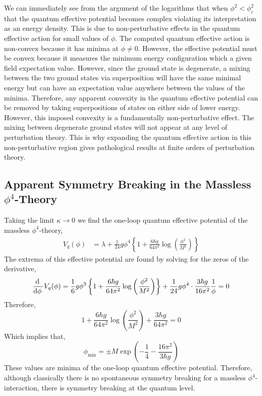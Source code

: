 \documentclass[12pt]{article}
\begin{document}
We can immediately see from the argument of the logarithms that when $\phi^2 < \phi_c^2$ that the quantum effective potential becomes complex violating its interpretation as an energy density. This is due to non-perturbative effects in the quantum effective action for small values of $\phi$. The computed quantum effective action is non-convex because it has minima at $\phi \neq 0$. However, the effective potential must be convex because it measures the minimum energy configuration which a given field expectation value. However, since the ground state is degenerate, a mixing between the two ground states via superposition will have the same minimal energy but can have an expectation value anywhere between the values of the minima. Therefore, any apparent convexity in the quantum effective potential can be removed by taking superpositions of states on either side of lower energy. However, this imposed convexity is a fundamentally non-perturbative effect. The mixing between degenerate ground states will not appear at any level of perturbation theory. This is why expanding the quantum effective action in this non-perturbative region gives pathological results at finite orders of perturbation theory. 

\subsection{Apparent Symmetry Breaking in the Massless $\phi^4$-Theory}

Taking the limit $\kappa \to 0$ we find the one-loop quantum effective potential of the massless $\phi^4$-theory,
\begin{align*}
V_q(\phi) & = \lambda + \frac{1}{24} g \phi^4 \left\{1 + \frac{6 \hbar g}{64 \pi^2} \log{\left( \frac{\phi^2}{M^2} \right)} \right\}
\end{align*}
The extrema of this effective potential are found by solving for the zeros of the derivative,
\[ \frac{\mathrm{d} \:}{\mathrm{d}\phi \:} V_q(\phi) = \frac{1}{6} g \phi^3 
\left\{1 + \frac{6 \hbar g}{64 \pi^2} \log{\left( \frac{\phi^2}{M^2} \right)} \right\} + \frac{1}{24} g \phi^4 \cdot \frac{3 \hbar g}{16 \pi^2} \frac{1}{\phi} = 0 \]
Therefore,
\[ 1 + \frac{6 \hbar g}{64 \pi^2} \log{\left( \frac{\phi^2}{M^2} \right)} + \frac{3 \hbar g}{64 \pi^2} = 0 \]
Which implies that,
\[ \phi_{\text{min}} = \pm M \exp{\left( -\frac{1}{4} - \frac{16 \pi^2}{3 \hbar g} \right)} \]
These values are minima of the one-loop quantum effective potential. Therefore, although classically there is no spontaneous symmetry breaking for a massless $\phi^4$-interaction, there is symmetry breaking at the quantum level. 
\end{document}
